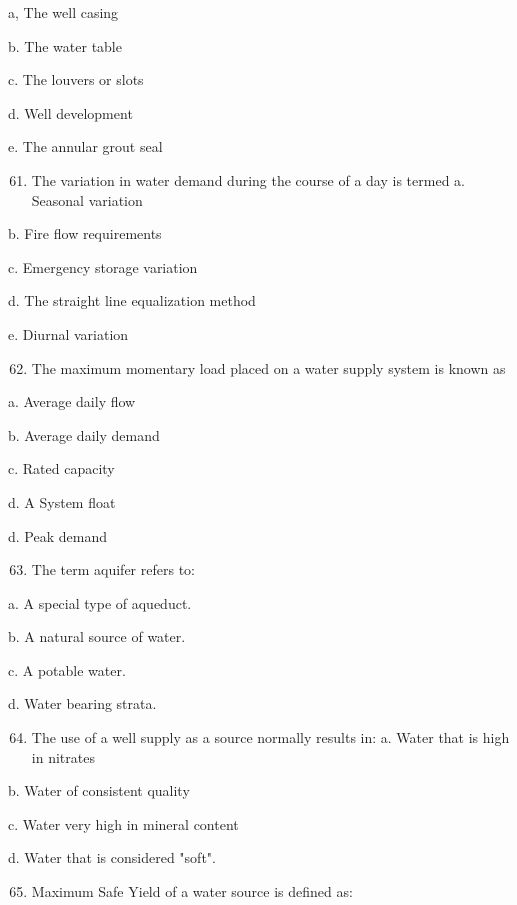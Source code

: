 \documentclass[10pt]{article}
\begin{document}
a, The well casing

b. The water table

c. The louvers or slots

d. Well development

e. The annular grout seal

\begin{enumerate}
  \setcounter{enumi}{60}
  \item The variation in water demand during the course of a day is termed a. Seasonal variation
\end{enumerate}

b. Fire flow requirements

c. Emergency storage variation

d. The straight line equalization method

e. Diurnal variation

\begin{enumerate}
  \setcounter{enumi}{61}
  \item The maximum momentary load placed on a water supply system is known as
\end{enumerate}

a. Average daily flow

b. Average daily demand

c. Rated capacity

d. A System float

d. Peak demand

\begin{enumerate}
  \setcounter{enumi}{62}
  \item The term aquifer refers to:
\end{enumerate}

a. A special type of aqueduct.

b. A natural source of water.

c. A potable water.

d. Water bearing strata.

\begin{enumerate}
  \setcounter{enumi}{63}
  \item The use of a well supply as a source normally results in: a. Water that is high in nitrates
\end{enumerate}

b. Water of consistent quality

c. Water very high in mineral content

d. Water that is considered "soft".

\begin{enumerate}
  \setcounter{enumi}{64}
  \item Maximum Safe Yield of a water source is defined as:
\end{enumerate}
\end{document}
